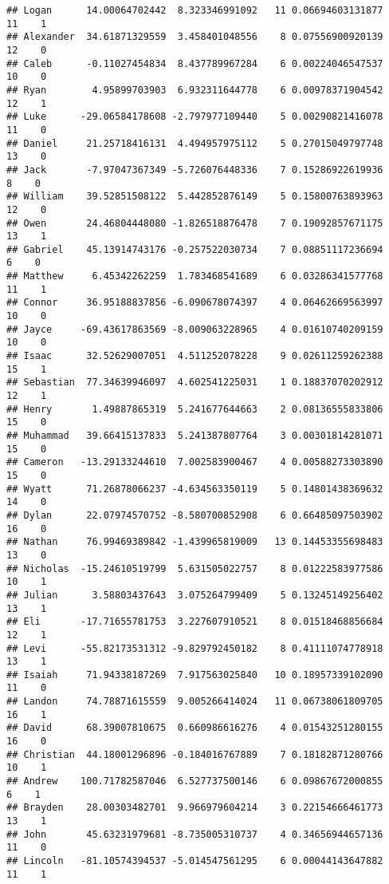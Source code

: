 \documentclass[
]{article}
\begin{document}
\begin{verbatim}
## Logan      14.00064702442  8.323346991092   11 0.06694603131877   11    1
## Alexander  34.61871329559  3.458401048556    8 0.07556900920139   12    0
## Caleb      -0.11027454834  8.437789967284    6 0.00224046547537   10    0
## Ryan        4.95899703903  6.932311644778    6 0.00978371904542   12    1
## Luke      -29.06584178608 -2.797977109440    5 0.00290821416078   11    0
## Daniel     21.25718416131  4.494957975112    5 0.27015049797748   13    0
## Jack       -7.97047367349 -5.726076448336    7 0.15286922619936    8    0
## William    39.52851508122  5.442852876149    5 0.15800763893963   12    0
## Owen       24.46804448080 -1.826518876478    7 0.19092857671175   13    1
## Gabriel    45.13914743176 -0.257522030734    7 0.08851117236694    6    0
## Matthew     6.45342262259  1.783468541689    6 0.03286341577768   11    1
## Connor     36.95188837856 -6.090678074397    4 0.06462669563997   10    0
## Jayce     -69.43617863569 -8.009063228965    4 0.01610740209159   10    0
## Isaac      32.52629007051  4.511252078228    9 0.02611259262388   15    1
## Sebastian  77.34639946097  4.602541225031    1 0.18837070202912   12    1
## Henry       1.49887865319  5.241677644663    2 0.08136555833806   15    0
## Muhammad   39.66415137833  5.241387807764    3 0.00301814281071   15    0
## Cameron   -13.29133244610  7.002583900467    4 0.00588273303890   15    0
## Wyatt      71.26878066237 -4.634563350119    5 0.14801438369632   14    0
## Dylan      22.07974570752 -8.580700852908    6 0.66485097503902   16    0
## Nathan     76.99469389842 -1.439965819009   13 0.14453355698483   13    0
## Nicholas  -15.24610519799  5.631505022757    8 0.01222583977586   10    1
## Julian      3.58803437643  3.075264799409    5 0.13245149256402   13    1
## Eli       -17.71655781753  3.227607910521    8 0.01518468856684   12    1
## Levi      -55.82173531312 -9.829792450182    8 0.41111074778918   13    1
## Isaiah     71.94338187269  7.917563025840   10 0.18957339102090   11    0
## Landon     74.78871615559  9.005266414024   11 0.06738061809705   16    1
## David      68.39007810675  0.660986616276    4 0.01543251280155   16    0
## Christian  44.18001296896 -0.184016767889    7 0.18182871280766   10    1
## Andrew    100.71782587046  6.527737500146    6 0.09867672000855    6    1
## Brayden    28.00303482701  9.966979604214    3 0.22154666461773   13    1
## John       45.63231979681 -8.735005310737    4 0.34656944657136   11    0
## Lincoln   -81.10574394537 -5.014547561295    6 0.00044143647882   11    1
\end{verbatim}
\end{document}
